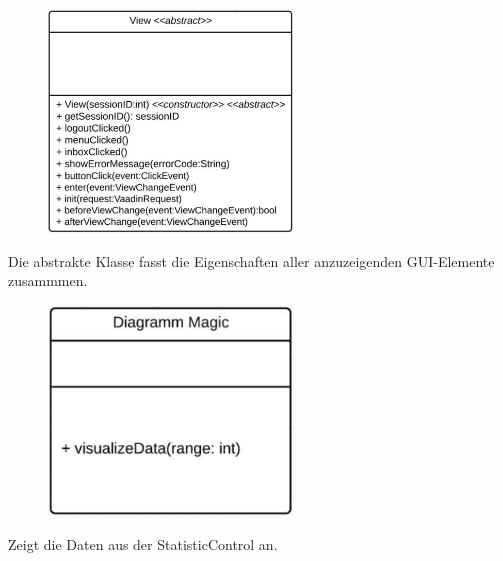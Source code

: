 \begin{itemize}
\begin{itemize}
                \end{itemize}
                    \begin{figure}[htb]
                    \centering
                    \includegraphics[width=6.5cm]{Diagramms/class/singleclass/ViewAbs.pdf}
                    \end{figure}
                    \newline
                    Die abstrakte Klasse fasst die Eigenschaften aller anzuzeigenden GUI-Elemente zusammmen.
                \begin{itemize}
                \end{itemize}

                                                    \begin{figure}[htb]
                    \centering
                    \includegraphics[width=6.5cm]{Diagramms/class/singleclass/ViewDraM.pdf}
                    \end{figure}
                    \newline
            \begin{itemize}
                    Zeigt die Daten aus der StatisticControl an.
            \end{itemize}


\end{itemize}
